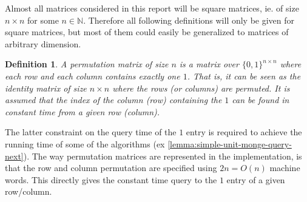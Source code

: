 \documentclass[twoside,11pt,openright]{report}
\newtheorem{mydef}{Definition}
\begin{document}
Almost all matrices considered in this report will be square matrices, ie. of size $n \times n$ for some $n \in \mathbb{N}$. Therefore all following definitions will only be given for square matrices, but most of them could easily be generalized to matrices of arbitrary dimension.

\begin{mydef}
  A permutation matrix of size $n$ is a matrix over $\{0,1\}^{n \times n}$ where each row and each column contains exactly one $1$. That is, it can be seen as the identity matrix of size $n \times n$ where the rows (or columns) are permuted.
  It is assumed that the index of the column (row) containing the $1$ can be found in constant time from a given row (column).
\end{mydef}
The latter constraint on the query time of the $1$ entry is required to achieve the running time of some of the algorithms (ex \cref{lemma:simple-unit-monge-query-next}). The way permutation matrices are represented in the implementation, is that the row and column permutation are specified using $2n = O(n)$ machine words. This directly gives the constant time query to the $1$ entry of a given row/column.
\end{document}
